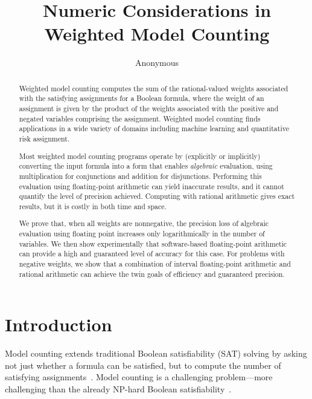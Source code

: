 \documentclass[letterpaper,USenglish,cleveref, autoref, thm-restate]{lipics-v2021}
\title{Numeric Considerations in Weighted Model Counting}
\author{Anonymous}{Unknown Institution}{}{}{}
\begin{document}
\maketitle

\begin{abstract}
 Weighted model counting computes the sum of the rational-valued weights
  associated with the satisfying assignments for a Boolean formula,
  where the weight of an assignment is given by the product of the
  weights associated with the positive and negated variables
  comprising the assignment.  Weighted model counting finds
  applications in a wide variety of domains including machine learning
  and quantitative risk assignment.

  Most weighted model counting programs operate by (explicitly or
  implicitly) converting the input formula into a form that enables
  \emph{algebraic} evaluation, using multiplication for conjunctions
  and addition for disjunctions.  Performing this evaluation using
  floating-point arithmetic can yield inaccurate results, and it
  cannot quantify the level of precision achieved.  Computing with
  rational arithmetic gives exact results, but it is costly in both
  time and space.

  We prove that, when all weights are nonnegative, the precision loss of
  algebraic evaluation using floating point increases only
  logarithmically in the number of variables.  We then show experimentally
  that software-based floating-point arithmetic can provide
  a high and guaranteed level of accuracy for this case.  For problems
  with negative weights, we show that a combination of interval
  floating-point arithmetic and rational arithmetic can achieve the
  twin goals of efficiency and guaranteed precision.
\end{abstract}

\section{Introduction}

Model counting extends traditional Boolean satisfiability (SAT) solving by
asking not just whether a formula can be satisfied, but to compute the
number of satisfying assignments~\cite{gomes:hs:2009}.  Model counting is a challenging
problem---more challenging than the already NP-hard Boolean
satisfiability~\cite{valiant:siam:1979}.
\end{document}
